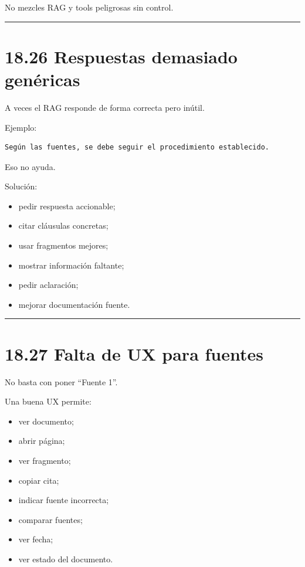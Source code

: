 No mezcles RAG y tools peligrosas sin control.

\begin{center}\rule{0.5\linewidth}{0.5pt}\end{center}

\section{18.26 Respuestas demasiado
genéricas}\label{respuestas-demasiado-genuxe9ricas}

A veces el RAG responde de forma correcta pero inútil.

Ejemplo:

\begin{lstlisting}
Según las fuentes, se debe seguir el procedimiento establecido.
\end{lstlisting}

Eso no ayuda.

Solución:

\begin{itemize}
\tightlist
\item
  pedir respuesta accionable;
\item
  citar cláusulas concretas;
\item
  usar fragmentos mejores;
\item
  mostrar información faltante;
\item
  pedir aclaración;
\item
  mejorar documentación fuente.
\end{itemize}

\begin{center}\rule{0.5\linewidth}{0.5pt}\end{center}

\section{18.27 Falta de UX para fuentes}\label{falta-de-ux-para-fuentes}

No basta con poner ``Fuente 1''.

Una buena UX permite:

\begin{itemize}
\tightlist
\item
  ver documento;
\item
  abrir página;
\item
  ver fragmento;
\item
  copiar cita;
\item
  indicar fuente incorrecta;
\item
  comparar fuentes;
\item
  ver fecha;
\item
  ver estado del documento.
\end{itemize}

